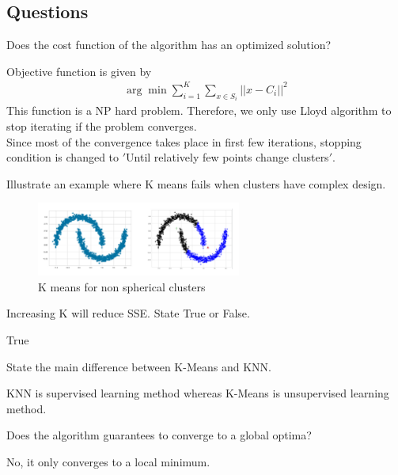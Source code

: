\documentclass[12pt,letterpaper, onecolumn]{exam}
\begin{document}
\subsection*{Questions}
\begin{questions}
\question[] Does the cost function of the algorithm has an optimized solution?\\
\begin{Solution}
Objective function is given by
\begin{align*}
\arg \min \sum_{i=1}^K \sum_{x\in S_i} ||x - C_i||^2
\end{align*}
This function is a NP hard problem. Therefore, we only use Lloyd algorithm to stop iterating if the problem converges.\\
Since most of the convergence takes place in first few iterations, stopping condition is changed to $'$Until relatively few points change clusters$'$.
\end{Solution}
\question[] Illustrate an example where K means fails when clusters have complex design.\\
\begin{Solution}
\begin{figure}[!h]
\caption{K means for non spherical clusters}
\centering
\includegraphics[width = 0.6\textwidth]{../images/k means.png}
\end{figure}

\end{Solution}
\question[] Increasing K will reduce SSE. State True or False.\\
\begin{Solution}
True
\end{Solution}
\question[] State the main difference between K-Means and KNN. \\
\begin{Solution}
KNN is supervised learning method whereas K-Means is unsupervised learning method.
\end{Solution}
\question[] Does the algorithm guarantees to converge to a global optima?\\
\begin{Solution}
No, it only converges to a local minimum.

\end{Solution}
\end{questions}
\end{document}
